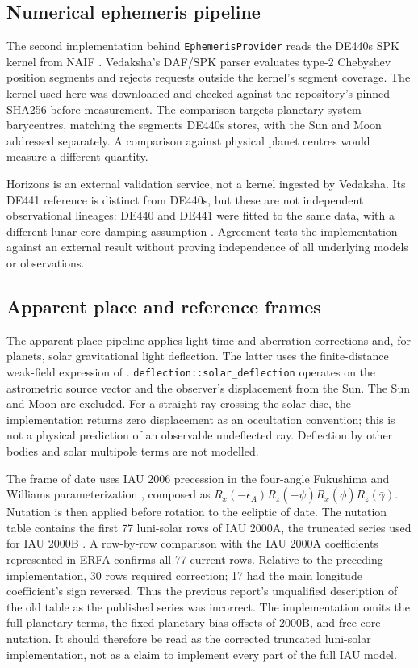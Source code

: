 \documentclass[11pt]{article}
\begin{document}
\subsection{Numerical ephemeris pipeline}

The second implementation behind \texttt{EphemerisProvider} reads the DE440s SPK kernel
from NAIF \citep{naif2021de440s,park2021de440}.
Vedaksha's DAF/SPK parser evaluates type-2 Chebyshev position segments and rejects requests
outside the kernel's segment coverage. The kernel used here was downloaded and checked
against the repository's pinned SHA256 before measurement.
The comparison targets planetary-system barycentres, matching the segments DE440s stores,
with the Sun and Moon addressed separately. A comparison against physical planet centres
would measure a different quantity.

Horizons is an external validation service, not a kernel ingested by Vedaksha.
Its DE441 reference is distinct from DE440s, but these are not independent observational
lineages: DE440 and DE441 were fitted to the same data, with a different lunar-core damping
assumption \citep{park2021de440}. Agreement tests the implementation against an external
result without proving independence of all underlying models or observations.

\subsection{Apparent place and reference frames}

The apparent-place pipeline applies light-time and aberration corrections and, for planets,
solar gravitational light deflection. The latter uses the finite-distance weak-field
expression of \citet[eqs.~75 and 77]{klioner2003deflection}.
\texttt{deflection::solar\_deflection} operates on the astrometric source vector and the
observer's displacement from the Sun. The Sun and Moon are excluded. For a straight ray
crossing the solar disc, the implementation returns zero displacement as an occultation
convention; this is not a physical prediction of an observable undeflected ray.
Deflection by other bodies and solar multipole terms are not modelled.

The frame of date uses IAU 2006 precession in the four-angle Fukushima and Williams
parameterization \citep{capitaine2003precession}, composed as
$R_x(-\epsilon_A)R_z(-\bar\psi)R_x(\bar\phi)R_z(\bar\gamma)$.
Nutation is then applied before rotation to the ecliptic of date.
The nutation table contains the first 77 luni-solar rows of IAU 2000A, the truncated
series used for IAU 2000B \citep{mccarthy2003nutation}.
A row-by-row comparison with the IAU 2000A coefficients represented in ERFA confirms all
77 current rows. Relative to the preceding implementation, 30 rows required correction;
17 had the main longitude coefficient's sign reversed. Thus the previous report's
unqualified description of the old table as the published series was incorrect.
The implementation omits the full planetary terms, the fixed planetary-bias offsets of
2000B, and free core nutation. It should therefore be read as the corrected truncated
luni-solar implementation, not as a claim to implement every part of the full IAU model.
\end{document}
